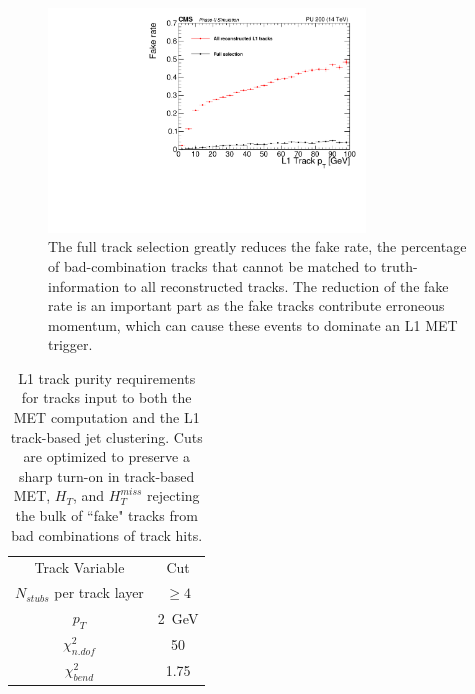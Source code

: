 \begin{figure}[htpb!]
\includegraphics[width=0.75\textwidth ]{StopSamplePUFakeRatePt.pdf}
\caption{The full track selection greatly reduces the fake rate, the percentage of bad-combination tracks that cannot be matched to truth-information to all reconstructed tracks. The reduction of the fake rate is an important part as the fake tracks contribute erroneous momentum, which can cause these events to dominate an L1 MET trigger.}
\label{fig:TkFakeRate}
\end{figure}

\begin{table}[h]
\begin{tabular}{|c|c|}
Track Variable & Cut\\
$N_{stubs}$ per track layer&$\geq 4$ \\
$p_{T}$ & 2~GeV \\
$\chi^{2}_{n.dof}$ & 50 \\
$\chi^{2}_{bend}$  & 1.75 \\

\end{tabular}
\caption{ L1 track purity requirements for tracks input to both the MET computation and the L1 track-based jet clustering. Cuts are optimized to preserve a sharp turn-on in track-based MET, $H_{T}$, and $H^{miss}_{T}$ rejecting the bulk of ``fake" tracks from bad combinations of track hits.}
\label{tab:trkpurity}
\end{table}

